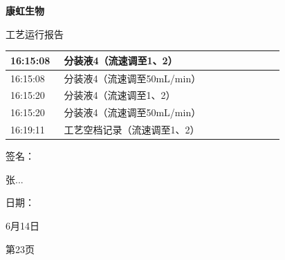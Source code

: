 \documentclass[UTF8,10pt,a4paper,fontset=fandol]{ctexart}
\newcommand{\fieldvalue}[1]{#1}
\newcommand{\handwritten}[1]{#1}
\begin{document}
\vspace{1.5em}

\noindent
\begin{minipage}[t]{0.48\linewidth}
\centering
\textbf{康虹生物}

\vspace{0.2em}
工艺运行报告

\vspace{0.4em}
\scriptsize
\begin{tabular}{|p{0.18\linewidth}|p{0.74\linewidth}|}
\hline
16:15:08 & 分装液4（流速调至1、2）\\ \hline
16:15:08 & 分装液4（流速调至50mL/min）\\ \hline
16:15:20 & 分装液4（流速调至1、2）\\ \hline
16:15:20 & 分装液4（流速调至50mL/min）\\ \hline
16:19:11 & 工艺空档记录（流速调至1、2）\\ \hline
\end{tabular}

\vspace{1em}
\raggedright
签名：

\fieldvalue{\handwritten{张...}}

日期：

\fieldvalue{\handwritten{6月14日}}

\vspace{1em}
\centering
第23页
\end{minipage}
\hfill
\end{document}
